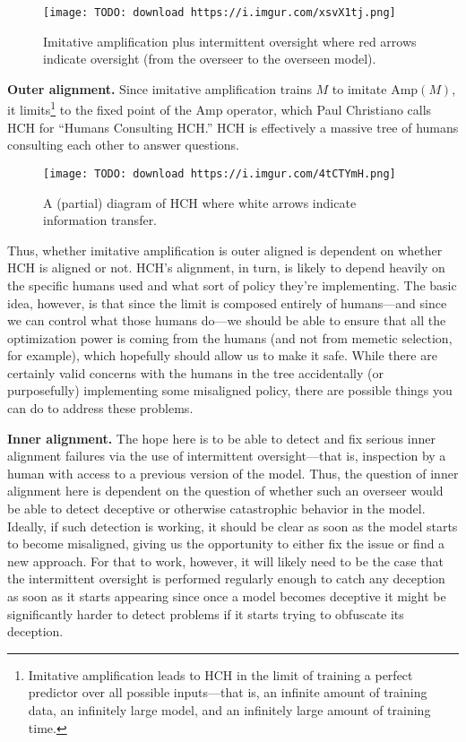 \begin{figure}[h!]
  \centering
  \texttt{[image: TODO: download https://i.imgur.com/xsvX1tj.png]}
  \caption{Imitative amplification plus intermittent oversight where red arrows indicate oversight (from the overseer to the overseen model).}
\end{figure}

\textbf{Outer alignment.} Since imitative amplification trains $M$ to imitate $\text{Amp}(M)$, it limits\footnote{Imitative amplification leads to HCH in the limit of training a perfect predictor over all possible inputs---that is, an infinite amount of training data, an infinitely large model, and an infinitely large amount of training time.} to the fixed point of the $\text{Amp}$ operator, which Paul Christiano calls HCH\cite{TODO: cite https://ai-alignment.com/strong-hch-bedb0dc08d4e} for ``Humans Consulting HCH.'' HCH is effectively a massive tree of humans consulting each other to answer questions.

\begin{figure}[h!]
  \centering
  \texttt{[image: TODO: download https://i.imgur.com/4tCTYmH.png]}
  \caption{A (partial) diagram of HCH where white arrows indicate information transfer.}
\end{figure}

Thus, whether imitative amplification is outer aligned is dependent on whether HCH is aligned or not. HCH's alignment, in turn, is likely to depend heavily on the specific humans used and what sort of policy they're implementing. The basic idea, however, is that since the limit is composed entirely of humans---and since we can control what those humans do---we should be able to ensure that all the optimization power is coming from the humans (and not from memetic selection, for example), which hopefully should allow us to make it safe. While there are certainly valid concerns with the humans in the tree accidentally (or purposefully) implementing some misaligned policy, there are possible things you can do to address these problems\cite{TODO: cite https://ai-alignment.com/universality-and-consequentialism-within-hch-c0bee00365bd}.

\textbf{Inner alignment.} The hope here is to be able to detect and fix serious inner alignment failures via the use of intermittent oversight---that is, inspection by a human with access to a previous version of the model. Thus, the question of inner alignment here is dependent on the question of whether such an overseer would be able to detect deceptive or otherwise catastrophic behavior in the model. Ideally, if such detection is working, it should be clear as soon as the model starts to become misaligned, giving us the opportunity to either fix the issue or find a new approach. For that to work, however, it will likely need to be the case that the intermittent oversight is performed regularly enough to catch any deception as soon as it starts appearing since once a model becomes deceptive it might be significantly harder to detect problems if it starts trying to obfuscate its deception.

